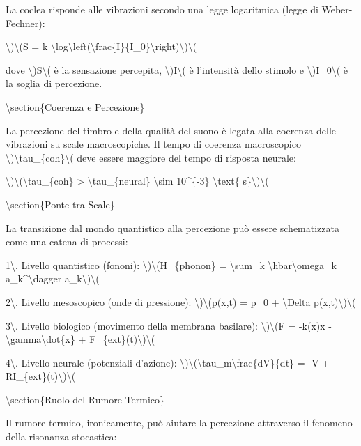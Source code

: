 \documentclass[a4paper,11pt]{article}
\begin{document}
La coclea risponde alle vibrazioni secondo una legge logaritmica (legge
di Weber-Fechner):

\textbackslash{})\textbackslash{}(S = k \textbackslash{}log\textbackslash{}left(\textbackslash{}frac\{I\}\{I\_0\}\textbackslash{}right)\textbackslash{})\textbackslash{}(

dove \textbackslash{})S\textbackslash{}( \`e la sensazione percepita, \textbackslash{})I\textbackslash{}( \`e l'intensit\`a dello stimolo e
\textbackslash{})I\_0\textbackslash{}( \`e la soglia di percezione.

\textbackslash{}section\{Coerenza e Percezione\}

La percezione del timbro e della qualit\`a del suono \`e legata alla
coerenza delle vibrazioni su scale macroscopiche. Il tempo di coerenza
macroscopico \textbackslash{})\textbackslash{}tau\_\{coh\}\textbackslash{}( deve essere maggiore del tempo di risposta
neurale:

\textbackslash{})\textbackslash{}(\textbackslash{}tau\_\{coh\} > \textbackslash{}tau\_\{neural\} \textbackslash{}sim 10\textasciicircum{}\{-3\} \textbackslash{}text\{ s\}\textbackslash{})\textbackslash{}(

\textbackslash{}section\{Ponte tra Scale\}

La transizione dal mondo quantistico alla percezione pu\`o essere
schematizzata come una catena di processi:

1\textbackslash{}. Livello quantistico (fononi):
\textbackslash{})\textbackslash{}(H\_\{phonon\} = \textbackslash{}sum\_k \textbackslash{}hbar\textbackslash{}omega\_k a\_k\textasciicircum{}\textbackslash{}dagger a\_k\textbackslash{})\textbackslash{}(

2\textbackslash{}. Livello mesoscopico (onde di pressione):
\textbackslash{})\textbackslash{}(p(x,t) = p\_0 + \textbackslash{}Delta p(x,t)\textbackslash{})\textbackslash{}(

3\textbackslash{}. Livello biologico (movimento della membrana basilare):
\textbackslash{})\textbackslash{}(F = -k(x)x - \textbackslash{}gamma\textbackslash{}dot\{x\} + F\_\{ext\}(t)\textbackslash{})\textbackslash{}(

4\textbackslash{}. Livello neurale (potenziali d'azione):
\textbackslash{})\textbackslash{}(\textbackslash{}tau\_m\textbackslash{}frac\{dV\}\{dt\} = -V + RI\_\{ext\}(t)\textbackslash{})\textbackslash{}(

\textbackslash{}section\{Ruolo del Rumore Termico\}

Il rumore termico, ironicamente, pu\`o aiutare la percezione attraverso il
fenomeno della risonanza stocastica:
\end{document}
